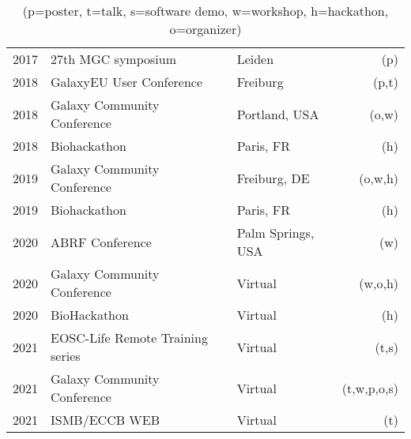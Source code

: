 \begin{table}[h!]
\begin{tabular}{llp{0.2cm}lr}
        2017 & 27th MGC symposium                          && Leiden          & (p) \\
        2018 & GalaxyEU User Conference                    && Freiburg        & (p,t) \\
        2018 & Galaxy Community Conference                 && Portland, USA   & (o,w) \\
        2018 & Biohackathon                                && Paris, FR       & (h) \\
        2019 & Galaxy Community Conference                 && Freiburg, DE    & (o,w,h) \\
        2019 & Biohackathon                                && Paris, FR       & (h) \\
        2020 & ABRF Conference                             && Palm Springs, USA & (w) \\
        2020 & Galaxy Community Conference                 && Virtual         & (w,o,h) \\
        2020 & BioHackathon                                && Virtual         & (h) \\
        2021 & EOSC-Life Remote Training series            && Virtual         & (t,s) \\
        2021 & Galaxy Community Conference                 && Virtual         & (t,w,p,o,s) \\
        2021 & ISMB/ECCB WEB                               && Virtual         & (t) \\

    \end{tabular}
    \caption*{(p=poster, t=talk, s=software demo, w=workshop, h=hackathon, o=organizer)}
\end{table}


